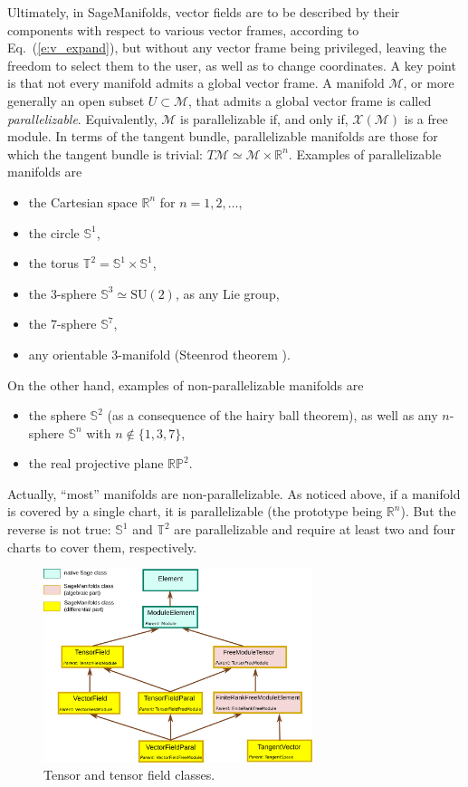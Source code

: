 \documentclass[a4paper]{jpconf}
\newcommand{\soft}[1]{\textsf{#1}}
\newcommand{\SM}{\soft{SageManifolds}}
\begin{document}
Ultimately, in \SM{}, vector fields are to be described by their 
components with respect to various vector frames, according to 
Eq.~(\ref{e:v_expand}), but without any vector frame being privileged, 
leaving the freedom to select them to the user, as well as to change 
coordinates. A key point is that 
not every manifold admits a global vector frame. 
A manifold $\mathcal{M}$, or more generally an open subset $U\subset\mathcal{M}$,
that admits a global vector frame is called 
\emph{parallelizable}. Equivalently,
$\mathcal{M}$ is parallelizable if, and only if, $\mathscr{X}(\mathcal{M})$
is a free module. In terms of the tangent bundle, 
parallelizable manifolds are those for which the tangent bundle is trivial:
$T\mathcal{M} \simeq \mathcal{M}\times \mathbb{R}^n$.
Examples of parallelizable manifolds are \cite{Lee13}
\begin{itemize}
\item the Cartesian space $\mathbb{R}^n$ for $n=1,2,\ldots$, 
\item the circle $\mathbb{S}^1$, 
\item the torus $\mathbb{T}^2 = \mathbb{S}^1\times \mathbb{S}^1$, 
\item the 3-sphere $\mathbb{S}^3 \simeq \mathrm{SU}(2)$, as any Lie group, 
\item the 7-sphere $\mathbb{S}^7$, 
\item any orientable 3-manifold (Steenrod theorem \cite{Steen51}).
\end{itemize}
On the other hand, examples of non-parallelizable manifolds are
\begin{itemize}
\item the sphere $\mathbb{S}^2$ (as a consequence of the hairy ball theorem),
as well as any $n$-sphere $\mathbb{S}^n$ with $n\not\in\{1,3,7\}$, 
\item the real projective plane $\mathbb{RP}^2$.
\end{itemize}
Actually, ``most'' manifolds are non-parallelizable. 
As noticed above, if a manifold is covered by a single chart, it is 
parallelizable (the prototype being $\mathbb{R}^n$). But the reverse is not 
true: $\mathbb{S}^1$ and $\mathbb{T}^2$ are parallelizable and require 
at least two and four charts to cover them, respectively. 

\begin{figure}
\begin{center}
\includegraphics[width=0.7\textwidth]{tensorfield_classes.pdf}
\end{center}
\caption{\label{f:tensor_classes} Tensor and tensor field classes.}
\end{figure}
\end{document}
